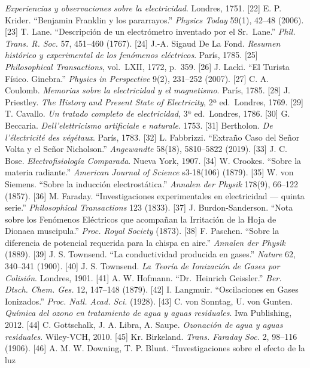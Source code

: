 \documentclass[
  11pt,
  letterpaper,
]{article}
\begin{document}
\emph{Experiencias y observaciones sobre la electricidad}. Londres,
1751. {[}22{]} E. P. Krider. ``Benjamin Franklin y los pararrayos.''
\emph{Physics Today} 59(1), 42--48 (2006). {[}23{]} T. Lane.
``Descripción de un electrómetro inventado por el Sr.~Lane.''
\emph{Phil. Trans. R. Soc.} 57, 451--460 (1767). {[}24{]} J.-A. Sigaud
De La Fond. \emph{Resumen histórico y experimental de los fenómenos
eléctricos}. París, 1785. {[}25{]} \emph{Philosophical Transactions},
vol.~LXII, 1772, p.~359. {[}26{]} J. Lacki. ``El Turista Físico.
Ginebra.'' \emph{Physics in Perspective} 9(2), 231--252 (2007). {[}27{]}
C. A. Coulomb. \emph{Memorias sobre la electricidad y el magnetismo}.
París, 1785. {[}28{]} J. Priestley. \emph{The History and Present State
of Electricity}, 2ª ed.~Londres, 1769. {[}29{]} T. Cavallo. \emph{Un
tratado completo de electricidad}, 3ª ed.~Londres, 1786. {[}30{]} G.
Beccaria. \emph{Dell'elettricismo artificiale e naturale}. 1753.
{[}31{]} Bertholon. \emph{De l'électricité des végétaux}. París, 1783.
{[}32{]} L. Fabbrizzi. ``Extraño Caso del Señor Volta y el Señor
Nicholson.'' \emph{Angewandte} 58(18), 5810--5822 (2019). {[}33{]} J. C.
Bose. \emph{Electrofisiología Comparada}. Nueva York, 1907. {[}34{]} W.
Crookes. ``Sobre la materia radiante.'' \emph{American Journal of
Science} s3-18(106) (1879). {[}35{]} W. von Siemens. ``Sobre la
inducción electrostática.'' \emph{Annalen der Physik} 178(9), 66--122
(1857). {[}36{]} M. Faraday. ``Investigaciones experimentales en
electricidad --- quinta serie.'' \emph{Philosophical Transactions} 123
(1833). {[}37{]} J. Burdon-Sanderson. ``Nota sobre los Fenómenos
Eléctricos que acompañan la Irritación de la Hoja de Dionaea
muscipula.'' \emph{Proc. Royal Society} (1873). {[}38{]} F. Paschen.
``Sobre la diferencia de potencial requerida para la chispa en aire.''
\emph{Annalen der Physik} (1889). {[}39{]} J. S. Townsend. ``La
conductividad producida en gases.'' \emph{Nature} 62, 340--341 (1900).
{[}40{]} J. S. Townsend. \emph{La Teoría de Ionización de Gases por
Colisión}. Londres, 1901. {[}41{]} A. W. Hofmann. ``Dr.~Heinrich
Geissler.'' \emph{Ber. Dtsch. Chem. Ges.} 12, 147--148 (1879). {[}42{]}
I. Langmuir. ``Oscilaciones en Gases Ionizados.'' \emph{Proc. Natl.
Acad. Sci.} (1928). {[}43{]} C. von Sonntag, U. von Gunten.
\emph{Química del ozono en tratamiento de agua y aguas residuales}. Iwa
Publishing, 2012. {[}44{]} C. Gottschalk, J. A. Libra, A. Saupe.
\emph{Ozonación de agua y aguas residuales}. Wiley-VCH, 2010. {[}45{]}
Kr. Birkeland. \emph{Trans. Faraday Soc.} 2, 98--116 (1906). {[}46{]} A.
M. W. Downing, T. P. Blunt. ``Investigaciones sobre el efecto de la luz
\end{document}
